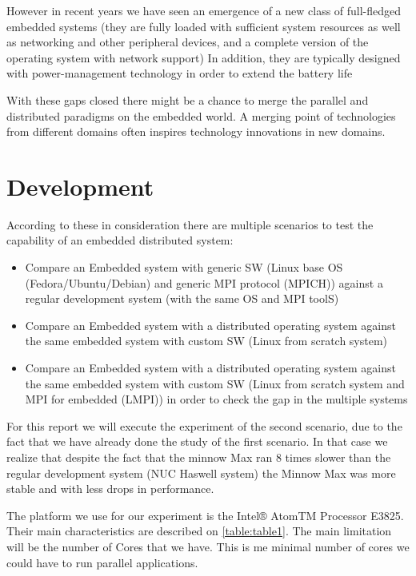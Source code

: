 \documentclass[a4paper]{article}
\begin{document}
However in recent years we have seen an emergence of a new class of full-fledged
embedded systems (they are fully loaded with sufficient system resources as well
as networking and other peripheral devices, and a complete version of the
operating system with network support) In addition, they are typically designed
with power-management technology in order to extend the battery life

With these gaps closed there might be a chance to merge the parallel and
distributed paradigms on the embedded world.  A merging point of technologies
from different domains often inspires technology innovations in new domains.

\section{Development}

According to these in consideration there are multiple scenarios to test the
capability of an embedded distributed system: 


\begin{itemize} 
    
    \item Compare an Embedded system with generic SW (Linux base OS
    (Fedora/Ubuntu/Debian) and generic MPI protocol (MPICH)) against a
    regular development system (with the same OS and MPI toolS)

    \item Compare an Embedded system with a distributed operating system
    against the same embedded system with custom SW (Linux from scratch system)


    \item Compare an Embedded system with a distributed operating system
    against the same embedded system with custom SW (Linux from scratch system and
    MPI for embedded (LMPI)) in order to check the gap in the multiple systems

\end{itemize}

For this report we will execute the experiment of the second scenario, due to the
fact that we have already done the study of the first scenario. In that case we
realize that despite the fact that the minnow Max ran 8 times slower than the
regular development system (NUC Haswell system) the Minnow Max was more stable
and with less drops in performance. 

The platform we use for our experiment is the Intel® AtomTM Processor
E3825. Their main characteristics are described on \ref{table:table1}. The main
limitation will be the number of Cores that we have. This is me minimal number
of cores we could have to run parallel applications. \cite{Intel_atom_spec}
\end{document}
